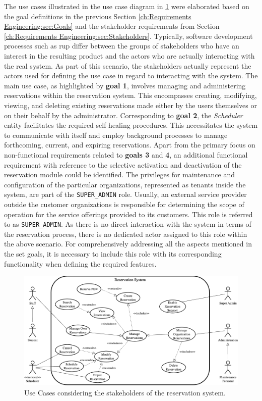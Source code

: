 The use cases illustrated in the use case diagram in \ref{fig:use-cases} were elaborated based on the goal definitions in the previous Section \ref{ch:Requirements Engineering:sec:Goals} and the stakeholder requirements from Section \ref{ch:Requirements Engineering:sec:Stakeholders}.
Typically, software development processes such as \acrshort{rup} \cite{kruchten_rational_1999} differ between the groups of stakeholders who have an interest in the resulting product and the actors who are actually interacting with the real system. 
As part of this scenario, the stakeholders actually represent the actors used for defining the use case in regard to interacting with the system.
The main use case, as highlighted by \textbf{goal 1}, involves managing and administering reservations within the reservation system. This encompasses creating, modifying, viewing, and deleting existing reservations made either by the users themselves or on their behalf by the administrator.
Corresponding to \textbf{goal 2}, the \textit{Scheduler} entity facilitates the required self-healing procedures. This necessitates the system to communicate with itself and employ background processes to manage forthcoming, current, and expiring reservations.
Apart from the primary focus on non-functional requirements related to \textbf{goals 3} and \textbf{4}, an additional functional requirement with reference to the selective activation and deactivation of the reservation module could be identified.
The privileges for maintenance and configuration of the particular organizations, represented as tenants inside the system, are part of the \verb|SUPER_ADMIN| role.
Usually, an external service provider outside the customer organizations is responsible for determining the scope of operation for the service offerings provided to its customers. This role is referred to as \verb|SUPER_ADMIN|. As there is no direct interaction with the system in terms of the reservation process, there is no dedicated actor assigned to this role within the above scenario.
For comprehensively addressing all the aspects mentioned in the set goals, it is necessary to include this role with its corresponding functionality when defining the required features.

\begin{figure}[h]
    \centering
    \includegraphics[scale=0.4]{resources/images/main/2_requirements_engineering/UseCases.png}
    \caption{Use Cases considering the stakeholders of the reservation system.}
    \label{fig:use-cases}
\end{figure}
